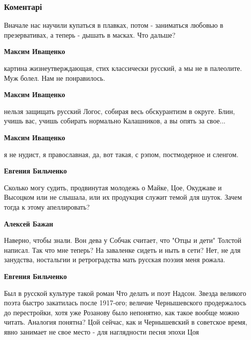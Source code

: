  
 
 
 
 
\subsubsection{Коментарі}
\label{sec:16_10_2021.fb.bilchenko_evgenia.2.poezia_ljubov_chekanova_margarita.cmt}

\begin{itemize} %
Вначале нас научили купаться в плавках, потом - заниматься любовью в презервативах, а теперь - дышать в масках. Что дальше?

\begin{itemize} %
\textbf{Максим Иващенко} 

картина жизнеутверждающая, стих классически русский, а мы не в палеолите. Муж
болел. Нам не понравилось.


\textbf{Максим Иващенко} 

нельзя защищать русский Логос, собирая весь обскурантизм в округе. Блин, учишь
вас, учишь собирать нормально Калашников, а вы опять за свое...


\textbf{Максим Иващенко} 

я не нудист, я православная, да, вот такая, с рэпом, постмодерное и сленгом.

\textbf{Евгения Бильченко} 

Сколько могу судить, продвинутая молодежь о Майке, Цое, Окуджаве и Высоцком или
не слышала, или их продукция служит темой для шуток. Зачем тогда к этому
апеллировать?

\textbf{Алексей Бажан} 

Наверно, чтобы знали. Вон дева у Собчак считает, что "Отцы и дети" Толстой
написал. Так что мне теперь? На заваленке сидеть и ныть в сети? Нет, не для
занудства, ностальгии и ретроградства мать русская поэзия меня рожала.

\textbf{Евгения Бильченко} 

Был в русской культуре такой роман Что делать и поэт Надсон. Звезда великого
поэта быстро закатилась после 1917-ого; величие Чернышевского продержалось до
перестройки, хотя уже Розанову было непонятно, как такое вообще можно читать.
Аналогия понятна? Цой сейчас, как и Чернышевский в советское время, явно
занимает не свое место - для наглядности песня эпохи Цоя


\end{itemize}
\end{itemize}
